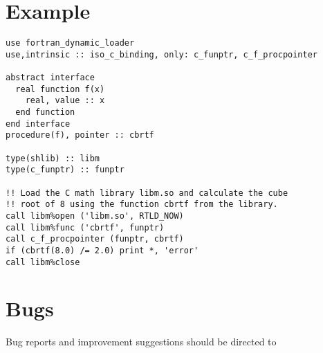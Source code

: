 \documentclass[11pt]{article}
\begin{document}
\section{Example}
\begin{verbatim}
use fortran_dynamic_loader
use,intrinsic :: iso_c_binding, only: c_funptr, c_f_procpointer

abstract interface
  real function f(x)
    real, value :: x
  end function
end interface
procedure(f), pointer :: cbrtf

type(shlib) :: libm
type(c_funptr) :: funptr

!! Load the C math library libm.so and calculate the cube
!! root of 8 using the function cbrtf from the library.
call libm%open ('libm.so', RTLD_NOW)
call libm%func ('cbrtf', funptr)
call c_f_procpointer (funptr, cbrtf)
if (cbrtf(8.0) /= 2.0) print *, 'error'
call libm%close
\end{verbatim}

\section{Bugs}
Bug reports and improvement suggestions should be directed to

\LatexManEnd
\end{document}
